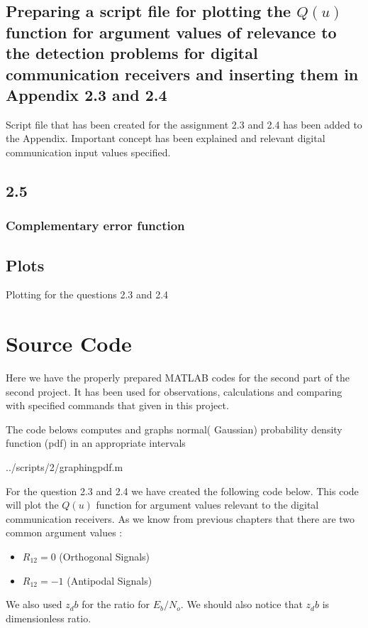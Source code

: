\subsection{Preparing a script file for plotting the $Q(u)$ function for argument values of relevance to the detection problems for digital communication receivers and inserting them in Appendix 2.3 and 2.4 }
Script file that has been created for the assignment 2.3 and 2.4 has been added to the Appendix. Important concept has been explained and relevant digital communication input values specified.
\subsection{2.5}





\subsubsection{Complementary error function}



\subsection{Plots}
Plotting for the questions 2.3 and 2.4
\section{Source Code}
Here we have the properly prepared MATLAB codes for the second part of the second project. It has been used for observations, calculations and comparing with specified commands that given in this project.

The code belows computes and graphs normal( Gaussian) probability density function (pdf) in an appropriate intervals

\begin{lstinputlisting}[language=Octave]{../scripts/2/graphingpdf.m}
\end{lstinputlisting}


For the question 2.3 and 2.4 we have created the following code below. This code will plot the $Q(u)$ function for argument values relevant to the digital communication receivers. As we know from previous chapters that there are two common argument values :
\begin{itemize}
	\item $R_12=0 $ (Orthogonal Signals) 
	\item $R_12=-1$ (Antipodal Signals)
\end{itemize}
We also used $z_db$ for the ratio for $E_b/N_o$. We should also notice that $z_db$ is dimensionless ratio.

